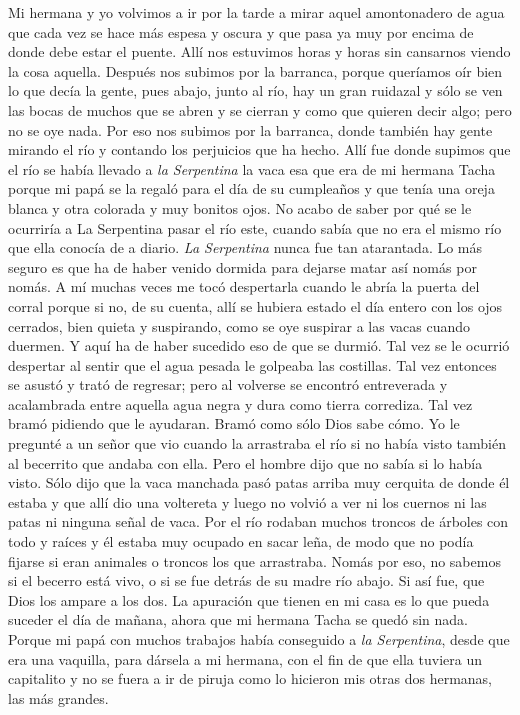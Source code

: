 \pend
%
\pstart
	Mi hermana y yo volvimos a ir por la tarde a mirar aquel amontonadero de agua que cada vez se hace más espesa y oscura y que pasa ya muy por encima de donde debe estar el puente. Allí nos estuvimos horas y horas sin cansarnos viendo la cosa aquella. Después nos subimos por la barranca, porque queríamos oír bien lo que decía la gente, pues abajo, junto al río, hay un gran ruidazal y sólo se ven las bocas de muchos que se abren y se cierran y como que quieren decir algo; pero no se oye nada. Por eso nos subimos por la barranca, donde también hay gente mirando el río y contando los perjuicios que ha hecho. Allí fue donde supimos que el río se había llevado a \textit{la Serpentina} la vaca esa que era de mi hermana Tacha porque mi papá se la regaló para el día de su cumpleaños y que tenía una oreja blanca y otra colorada y muy bonitos ojos.
\pend
%
\pstart
	No acabo de saber por qué se le ocurriría a La Serpentina pasar el río este, cuando sabía que no era el mismo río que ella conocía de a diario. \textit{La Serpentina} nunca fue tan atarantada. Lo más seguro es que ha de haber venido dormida para dejarse matar así nomás por nomás. A mí muchas veces me tocó despertarla cuando le abría la puerta del corral porque si no, de su cuenta, allí se hubiera estado el día entero con los ojos cerrados, bien quieta y suspirando, como se oye suspirar a las vacas cuando duermen.
\pend
%
\pstart
	Y aquí ha de haber sucedido eso de que se durmió. Tal vez se le ocurrió despertar al sentir que el agua pesada le golpeaba las costillas. Tal vez entonces se asustó y trató de regresar; pero al volverse se encontró entreverada y acalambrada entre aquella agua negra y dura como tierra corrediza. Tal vez bramó pidiendo que le ayudaran.
\pend
%
\pstart
	Bramó como sólo Dios sabe cómo.
\pend
%
\pstart
	Yo le pregunté a un señor que vio cuando la arrastraba el río si no había visto también al becerrito que andaba con ella. Pero el hombre dijo que no sabía si lo había visto. Sólo dijo que la vaca manchada pasó patas arriba muy cerquita de donde él estaba y que allí dio una voltereta y luego no volvió a ver ni los cuernos ni las patas ni ninguna señal de vaca. Por el río rodaban muchos troncos de árboles con todo y raíces y él estaba muy ocupado en sacar leña, de modo que no podía fijarse si eran animales o troncos los que arrastraba.
\pend
%
\pstart
	Nomás por eso, no sabemos si el becerro está vivo, o si se fue detrás de su madre
	río abajo. Si así fue, que Dios los ampare a los dos.
\pend
%
\pstart
	La apuración que tienen en mi casa es lo que pueda suceder el día de mañana, ahora que mi hermana Tacha se quedó sin nada. Porque mi papá con muchos trabajos había conseguido a \textit{la Serpentina}, desde que era una vaquilla, para dársela a mi hermana, con el fin de que ella tuviera un capitalito y no se fuera a ir de piruja como lo hicieron mis otras dos hermanas, las más grandes.
